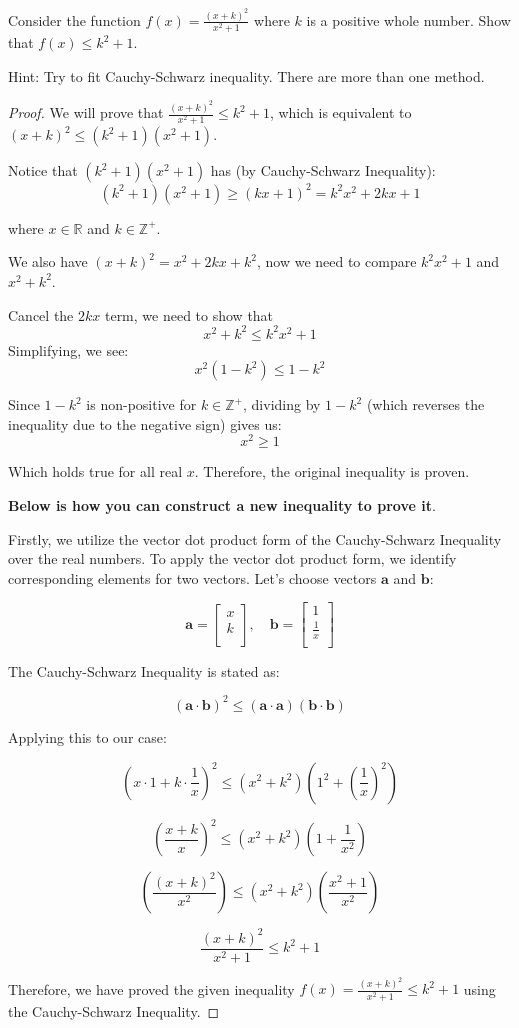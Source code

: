\documentclass[
	12pt, %
	fleqn, %
	a4paper, %
]{LegrandOrangeBook}
\begin{document}
\begin{exercise}
    Consider the function \( f(x) = \frac{(x+k)^2}{x^2+1} \) where \( k \) is a positive whole number. Show that \( f(x) \leq k^2 + 1 \).
\end{exercise}
Hint: Try to fit Cauchy-Schwarz inequality. There are more than one method.
\begin{proof}
    We will prove that \( \frac{(x+k)^2}{x^2+1} \leq k^2 + 1 \), which is equivalent to \( (x+k)^2 \leq (k^2 + 1)(x^2 + 1) \).

Notice that \( (k^2 + 1)(x^2 + 1) \) has (by Cauchy-Schwarz Inequality):
\[ (k^2 + 1)(x^2 + 1) \geq (kx + 1)^2 = k^2x^2 + 2kx + 1 \]

where \( x \in \mathbb{R} \) and \( k \in \mathbb{Z}^+ \).

We also have \( (x+k)^2 = x^2 + 2kx + k^2 \), now we need to compare \( k^2x^2 + 1 \) and \( x^2 + k^2 \).

Cancel the $2kx$ term, we need to show that
\[ x^2 + k^2 \leq k^2x^2 + 1 \]
Simplifying, we see:
\[ x^2(1 - k^2) \leq 1 - k^2 \]

Since \( 1 - k^2 \) is non-positive for \( k \in \mathbb{Z}^+ \), dividing by \( 1 - k^2 \) (which reverses the inequality due to the negative sign) gives us:
\[ x^2 \geq 1 \]

Which holds true for all real \( x \). Therefore, the original inequality is proven.

\textbf{Below is how you can construct a new inequality to prove it}.

Firstly, we utilize the vector dot product form of the Cauchy-Schwarz Inequality over the real numbers. To apply the vector dot product form, we identify corresponding elements for two vectors. Let's choose vectors \( \mathbf{a} \) and \( \mathbf{b} \):

\[
\mathbf{a} = \begin{bmatrix}
x \\
k \\
\end{bmatrix}, \quad \mathbf{b} = \begin{bmatrix}
1 \\
\frac{1}{x} \\
\end{bmatrix}
\]

The Cauchy-Schwarz Inequality is stated as:

\[
(\mathbf{a} \cdot \mathbf{b})^2 \leq (\mathbf{a} \cdot \mathbf{a})(\mathbf{b} \cdot \mathbf{b})
\]

Applying this to our case:

\[
\left( x \cdot 1 + k \cdot \frac{1}{x} \right)^2 \leq (x^2 + k^2)\left( 1^2 + \left(\frac{1}{x}\right)^2 \right)
\]

\[
\left( \frac{x + k}{x} \right)^2 \leq (x^2 + k^2)\left( 1 + \frac{1}{x^2} \right)
\]

\[
\left(\frac{(x+k)^2}{x^2}\right) \leq (x^2 + k^2)\left( \frac{x^2+1}{x^2} \right)
\]

\[
\frac{(x+k)^2}{x^2+1} \leq k^2 + 1
\]

Therefore, we have proved the given inequality \( f(x) = \frac{(x+k)^2}{x^2+1} \leq k^2 + 1 \) using the Cauchy-Schwarz Inequality.

\end{proof}
\end{document}
